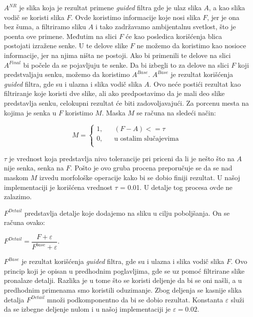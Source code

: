 \documentclass[a4paper,12pt,titlepage]{article}
\begin{document}
$A^{NR}$ je slika koja je rezultat primene \emph{guided} filtra gde je ulaz slika $A$, a kao slika vodič se koristi slika $F$. Ovde koristimo informacije koje nosi slika $F$, jer je ona bez šuma, a filtriramo sliku $A$ i tako zadržavamo ambijentalnu svetlost, što je poenta ove primene. Međutim na slici $F$ će kao posledica korišćenja blica postojati izražene senke. U te delove slike $F$ ne možemo da koristimo kao nosioce informacije, jer na njima ništa ne postoji. Ako bi primenili te delove na slici $A^{Final}$ bi počele da se pojavljuju te senke. Da bi izbegli to za delove na slici $F$ koji predstvaljaju senku, možemo da koristimo $A^{Base}$. $A^{Base}$ je rezultat korišćenja  \emph{guided} filtra, gde su i ulazna i slika vodič slika $A$. Ovo neće postići rezultat kao filtriranje koje koristi dve slike, ali ako predpostavimo da je mali deo slike predstavlja senku, celokupni rezultat će biti zadovoljavajući. Za porcenu mesta na kojima je senka u $F$ koristimo $M$. Maska $M$ se računa na sledeći način:

\[   
M = 
     \begin{cases}
       \text{1,} &\quad\text{$(F - A) <= \tau$}\\
       \text{0,} &\quad\text{u ostalim slučajevima} \\
     \end{cases}
\]

$\tau$ je vrednost koja predstavlja nivo tolerancije pri priceni da li je nešto što na $A$ nije senka, senka na $F$. Pošto je ovo gruba procena preporučuje se da se nad maskom $M$ izvedu morfološke operacije kako bi se dobio finiji rezultat. U našoj implementaciji je korišćena vrednost $\tau$ = 0.01. U detalje tog procesa ovde ne zalazimo.

$F^{Detail}$ predstavlja detalje koje dodajemo na sliku u cilju poboljšanja. On se računa ovako:

\begin{center}
$F^{Detail} = \dfrac{F + \varepsilon}{F^{base} + \varepsilon}$.
\end{center}

$F^{Base}$ je rezultat korišćenja  \emph{guided} filtra, gde su i ulazna i slika vodič slika $F$. Ovo princip koji je opisan u predhodnim poglavljima, gde se uz pomoć filtrirane slike pronalaze detalji. Razlika je u tome što se koristi deljenje da bi se oni našli, a u predhodnim primenama smo koristili oduzimanje. Zbog deljenja se kasnije slika detalja $F^{Detail}$ množi podkomponentno da bi se dobio rezultat. Konstanta $\varepsilon$ služi da se izbegne deljenje nulom i u našoj implementaciji je $\varepsilon = 0.02$.
\end{document}
